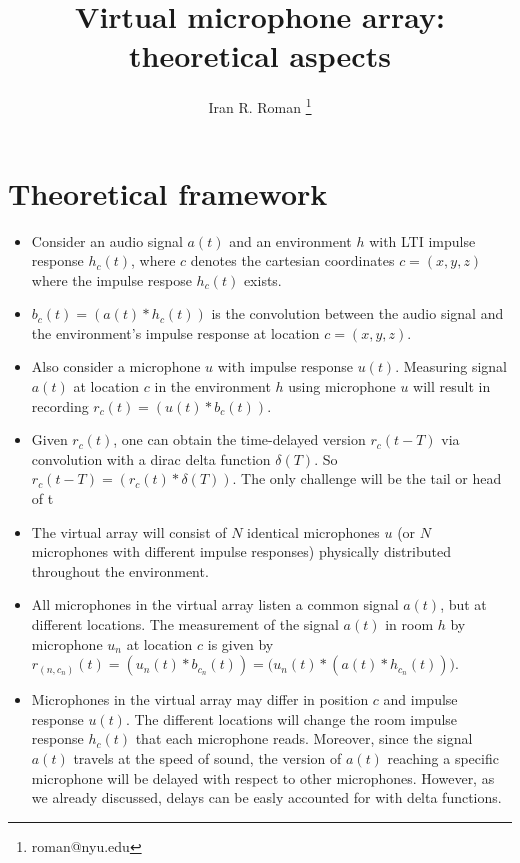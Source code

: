 \documentclass[14pt]{extarticle}
\title{Virtual microphone array: theoretical aspects}
\author{Iran R. Roman \thanks{roman@nyu.edu}}
\affil{Music and Audio Research Laboratory, New York University}
\date{}
\begin{document}
\maketitle
\tableofcontents

\vspace{.25in}

\section{Theoretical framework}

\begin{itemize}

\item Consider an audio signal $a(t)$ and an environment $h$ with LTI impulse response $h_c(t)$, where $c$ denotes the cartesian coordinates $c=(x,y,z)$ where the impulse respose $h_c(t)$ exists.

\item $b_c(t) = (a(t) \ast h_c(t))$ is the convolution between the audio signal and the environment's impulse response at location $c=(x,y,z)$. 

\item Also consider a microphone $u$ with impulse response $u(t)$. Measuring signal $a(t)$ at location $c$ in the environment $h$ using microphone $u$ will result in recording $r_c(t) = (u(t) \ast b_c(t))$.

\item Given $r_c(t)$, one can obtain the time-delayed version $r_c(t-T)$ via convolution with a dirac delta function $\delta(T)$. So $r_c(t-T) = (r_c(t) \ast \delta(T))$. The only challenge will be the tail or head of t

\item The virtual array will consist of $N$ identical microphones $u$ (or $N$ microphones with different impulse responses) physically distributed throughout the environment.

\item All microphones in the virtual array listen a common signal $a(t)$, but at different locations. The measurement of the signal $a(t)$ in room $h$ by microphone $u_n$ at location $c$ is given by $r_{(n,c_n)}(t) = (u_n(t) \ast b_{c_n}(t)) = \big(u_n(t) \ast (a(t) \ast h_{c_n}(t))\big)$.

\item Microphones in the virtual array may differ in position $c$ and impulse response $u(t)$. The different locations will change the room impulse response $h_c(t)$ that each microphone reads. Moreover, since the signal $a(t)$ travels at the speed of sound, the version of $a(t)$ reaching a specific microphone will be delayed with respect to other microphones. However, as we already discussed, delays can be easly accounted for with delta functions.  


\end{itemize}
\end{document}
